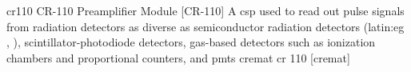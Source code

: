 \newglsXequipment%
{cr110}%
{CR{\--}110 Preamplifier Module}%
[CR{\--}110]%
{A \gls{csp} used to read out pulse signals from radiation detectors as diverse as semiconductor radiation detectors (\gls{latin:eg} , ), scintillator-photodiode detectors, gas-based detectors such as ionization chambers and proportional counters, and \glspl{pmt}}%
{cremat cr 110}%
[cremat]%